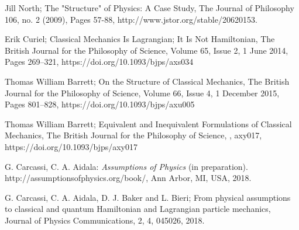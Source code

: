 \documentclass[11pt]{article}
\begin{document}
\begin{thebibliography}{0}
		
	 Jill North; The "Structure" of Physics: A Case Study, The Journal of Philosophy 106, no. 2 (2009), Pages 57-88, http://www.jstor.org/stable/20620153.
	
	Erik Curiel; Classical Mechanics Is Lagrangian; It Is Not Hamiltonian, The British Journal for the Philosophy of Science, Volume 65, Issue 2, 1 June 2014, Pages 269–321, https://doi.org/10.1093/bjps/axs034
	
	Thomas William Barrett; On the Structure of Classical Mechanics, The British Journal for the Philosophy of Science, Volume 66, Issue 4, 1 December 2015, Pages 801–828, https://doi.org/10.1093/bjps/axu005

	Thomas William Barrett; Equivalent and Inequivalent Formulations of Classical Mechanics, The British Journal for the Philosophy of Science, , axy017, https://doi.org/10.1093/bjps/axy017

	 G. Carcassi, C. A. Aidala: \emph{Assumptions of Physics} (in preparation). http://assumptionsofphysics.org/book/, Ann Arbor, MI, USA, 2018.
	
	 G. Carcassi, C. A. Aidala, D. J. Baker and L. Bieri; From physical assumptions to classical and quantum Hamiltonian and Lagrangian particle mechanics, Journal of Physics Communications, 2, 4, 045026, 2018.

	
\end{thebibliography}
\end{document}
